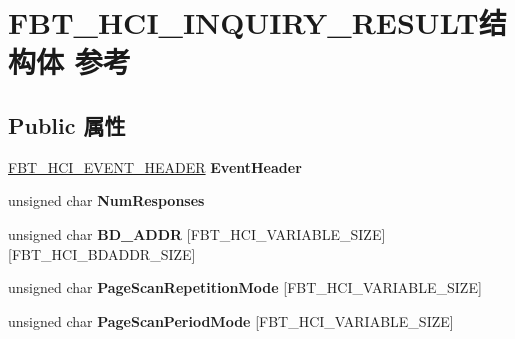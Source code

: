 \hypertarget{struct_f_b_t___h_c_i___i_n_q_u_i_r_y___r_e_s_u_l_t}{}\section{F\+B\+T\+\_\+\+H\+C\+I\+\_\+\+I\+N\+Q\+U\+I\+R\+Y\+\_\+\+R\+E\+S\+U\+L\+T结构体 参考}
\label{struct_f_b_t___h_c_i___i_n_q_u_i_r_y___r_e_s_u_l_t}
\subsection*{Public 属性}
\begin{DoxyCompactItemize}
\item 
\mbox{\label{struct_f_b_t___h_c_i___i_n_q_u_i_r_y___r_e_s_u_l_t_adcee7633405545d662963ef732dfe1c5}} 
\hyperlink{struct_f_b_t___h_c_i___e_v_e_n_t___h_e_a_d_e_r}{F\+B\+T\+\_\+\+H\+C\+I\+\_\+\+E\+V\+E\+N\+T\+\_\+\+H\+E\+A\+D\+ER} {\bfseries Event\+Header}
\item 
\mbox{\label{struct_f_b_t___h_c_i___i_n_q_u_i_r_y___r_e_s_u_l_t_a51d5d85114bb3421761e32dd6d3096b3}} 
unsigned char {\bfseries Num\+Responses}
\item 
\mbox{\label{struct_f_b_t___h_c_i___i_n_q_u_i_r_y___r_e_s_u_l_t_a78019f2f2d6c86e9a20a84298d987135}} 
unsigned char {\bfseries B\+D\+\_\+\+A\+D\+DR} \mbox{[}F\+B\+T\+\_\+\+H\+C\+I\+\_\+\+V\+A\+R\+I\+A\+B\+L\+E\+\_\+\+S\+I\+ZE\mbox{]}\mbox{[}F\+B\+T\+\_\+\+H\+C\+I\+\_\+\+B\+D\+A\+D\+D\+R\+\_\+\+S\+I\+ZE\mbox{]}
\item 
\mbox{\label{struct_f_b_t___h_c_i___i_n_q_u_i_r_y___r_e_s_u_l_t_ac405190e371fb74f982477523d182de7}} 
unsigned char {\bfseries Page\+Scan\+Repetition\+Mode} \mbox{[}F\+B\+T\+\_\+\+H\+C\+I\+\_\+\+V\+A\+R\+I\+A\+B\+L\+E\+\_\+\+S\+I\+ZE\mbox{]}
\item 
\mbox{\label{struct_f_b_t___h_c_i___i_n_q_u_i_r_y___r_e_s_u_l_t_ae2deafceb88152f4842abd7c71ded518}} 
unsigned char {\bfseries Page\+Scan\+Period\+Mode} \mbox{[}F\+B\+T\+\_\+\+H\+C\+I\+\_\+\+V\+A\+R\+I\+A\+B\+L\+E\+\_\+\+S\+I\+ZE\mbox{]}

\end{DoxyCompactItemize}
